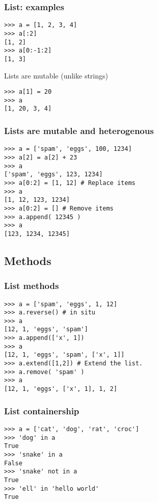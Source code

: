 \documentclass[14pt,compress]{beamer}
\newcounter{time}
\newcommand{\inctime}[1]{\addtocounter{time}{#1}{\tiny \thetime\ m}}
\begin{document}
\begin{frame}[fragile]
  \frametitle{List: examples}
\begin{lstlisting}
>>> a = [1, 2, 3, 4]
>>> a[:2]
[1, 2]
>>> a[0:-1:2]
[1, 3]
\end{lstlisting}
\pause
\alert{Lists are mutable (unlike strings)}
\begin{lstlisting}
>>> a[1] = 20
>>> a
[1, 20, 3, 4]
\end{lstlisting}
\end{frame}

\begin{frame}[fragile]
  \frametitle{Lists are mutable and heterogenous}
\begin{lstlisting}
>>> a = ['spam', 'eggs', 100, 1234]
>>> a[2] = a[2] + 23
>>> a
['spam', 'eggs', 123, 1234]
>>> a[0:2] = [1, 12] # Replace items
>>> a
[1, 12, 123, 1234]
>>> a[0:2] = [] # Remove items
>>> a.append( 12345 )
>>> a
[123, 1234, 12345]
\end{lstlisting}
\inctime{10}
\end{frame}


\subsection{Methods}
\begin{frame}[fragile]
  \frametitle{List methods}
\begin{lstlisting}
>>> a = ['spam', 'eggs', 1, 12]
>>> a.reverse() # in situ
>>> a
[12, 1, 'eggs', 'spam']
>>> a.append(['x', 1])
>>> a
[12, 1, 'eggs', 'spam', ['x', 1]]
>>> a.extend([1,2]) # Extend the list.
>>> a.remove( 'spam' )
>>> a
[12, 1, 'eggs', ['x', 1], 1, 2]
\end{lstlisting}
\end{frame}

\begin{frame}[fragile]
  \frametitle{List containership}
  \begin{lstlisting}
>>> a = ['cat', 'dog', 'rat', 'croc']
>>> 'dog' in a
True
>>> 'snake' in a
False
>>> 'snake' not in a
True
>>> 'ell' in 'hello world'
True
  \end{lstlisting}
  \inctime{5}
\end{frame}

\end{document}
